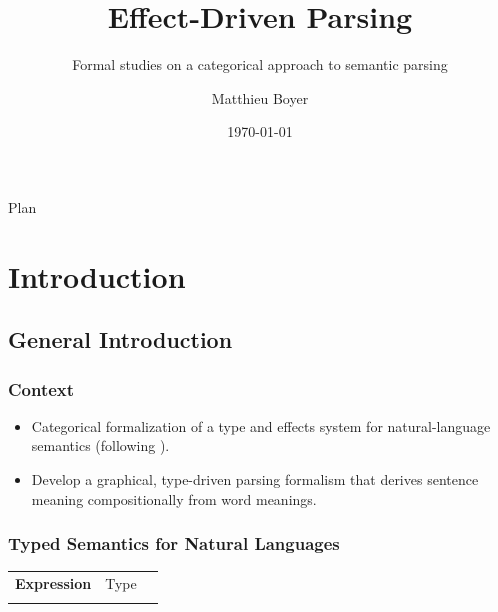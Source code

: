 \documentclass[math, english, info]{beamercours}
\title{Effect-Driven Parsing}
\subtitle{Formal studies on a categorical approach to semantic parsing}
\institute{École Normale Supérieure | Yale University}
\author{Matthieu Boyer}
\date{\today}
\begin{document}
\fancytitleframe

\begin{frame}{Plan}
	\tableofcontents[subsectionstyle=hide,sectionstyle=show]
\end{frame}

\section{Introduction}
\subsection{General Introduction}
\begin{frame}
	\frametitle{Context}
	\begin{itemize}
		\item Categorical formalization of a type and effects system for
		      natural-language semantics
		      (following \cite{bumfordEffectdrivenInterpretationFunctors2025}).

		\item Develop a graphical, type-driven parsing formalism that
		      derives sentence meaning compositionally from word meanings.
	\end{itemize}
\end{frame}

\begin{frame}[fragile]
	\frametitle{Typed Semantics for Natural Languages}
	\begin{center}
		\setcellgapes{3pt}
		\makegapedcells
		\begin{NiceTabular}{>{\bf}LLL}
			Expression & \rm Type & \lambda{} \\
			\CodeAfter
		\end{NiceTabular}
	\end{center}
\end{frame}
\end{document}

